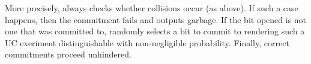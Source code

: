 More precisely, \simcom always checks whether collisions occur (as above). 
If such a case happens, then the commitment fails and \simcom outputs garbage.
If the bit opened is not one that was committed to, \simcom randomly selects a bit to commit to rendering such a UC exeriment distinguishable with non-negligible probability.
Finally, correct commitments proceed unhindered.

%


